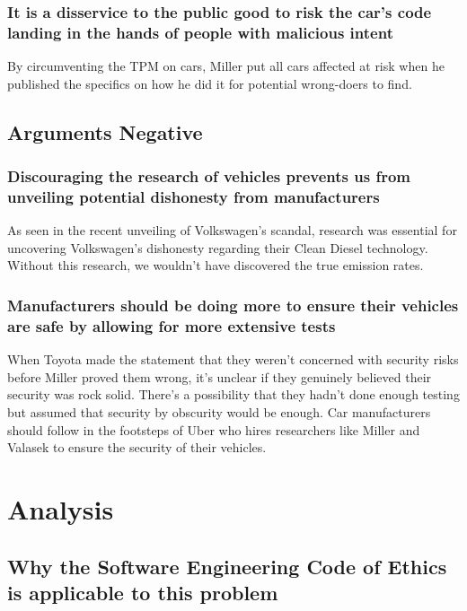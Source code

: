 \documentclass[12pt]{article}
\begin{document}
\begin{multicols}{2}
\subsubsection{It is a disservice to the public good to risk the car's code landing in the hands of people with malicious intent}

By circumventing the TPM on cars, Miller put all cars affected at risk when he published the specifics on how he did it\cite{officialPaper} for potential wrong-doers to find. 

\subsection{Arguments Negative}

\subsubsection{Discouraging the research of vehicles prevents us from unveiling potential dishonesty from manufacturers}

As seen in the recent unveiling of Volkswagen's scandal, research was essential for uncovering Volkswagen's dishonesty regarding their Clean Diesel technology. \cite{vwScandal} Without this research, we wouldn't have discovered the true emission rates.

\subsubsection{Manufacturers should be doing more to ensure their vehicles are safe by allowing for more extensive tests}

When Toyota made the statement that they weren't concerned with security risks \cite{originalHack} before Miller proved them wrong, it's unclear if they genuinely believed their security was rock solid. There's a possibility that they hadn't done enough testing but assumed that security by obscurity would be enough\cite{brokeDMCA}. Car manufacturers should follow in the footsteps of Uber who hires researchers like Miller and Valasek to ensure the security of their vehicles\cite{uber}.


\section{Analysis}

\subsection{Why the Software Engineering Code of Ethics is applicable to this problem}


\end{multicols}
\end{document}
